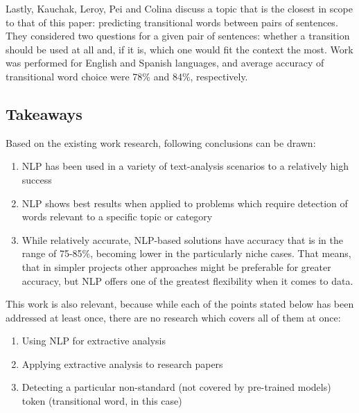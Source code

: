 Lastly, Kauchak, Leroy, Pei and Colina \cite{lr-10} discuss a topic that is the closest in scope to that of this paper: predicting transitional words between pairs of sentences. They considered two questions for a given pair of sentences: whether a transition should be used at all and, if it is, which one would fit the context the most. Work was performed for English and Spanish languages, and average accuracy of transitional word choice were 78\% and 84\%, respectively.

\subsection{Takeaways}

Based on the existing work research, following conclusions can be drawn:
\begin{enumerate}
    \item NLP has been used in a variety of text-analysis scenarios to a relatively high success
    \item NLP shows best results when applied to problems which require detection of words relevant to a specific topic or category
    \item While relatively accurate, NLP-based solutions have accuracy that is in the range of 75-85\%, becoming lower in the particularly niche cases. That means, that in simpler projects other approaches might be preferable for greater accuracy, but NLP offers one of the greatest flexibility when it comes to data.
\end{enumerate}

This work is also relevant, because while each of the points stated below has been addressed at least once, there are no research which covers all of them at once:

\begin{enumerate}
    \item Using NLP for extractive analysis
    \item Applying extractive analysis to research papers
    \item Detecting a particular non-standard (not covered by pre-trained models) token (transitional word, in this case)
\end{enumerate}

